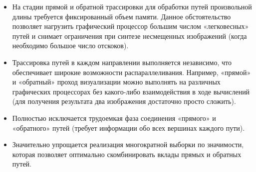 \begin{itemize}  
  \item На стадии прямой и обратной трассировки для обработки путей произвольной длины требуется фиксированный объем памяти. Данное обстоятельство позволяет нагрузить графический процессор большим числом «легковесных» путей и снимает ограничения при синтезе несмещенных изображений (когда необходимо большое число отскоков).
  
  \item Трассировка путей в каждом направлении выполняется независимо, что обеспечивает широкие возможности распараллеливания. Например, «прямой» и «обратный» проход визуализации можно выполнять на различных графических процессорах без какого-либо взаимодействия в ходе вычислений (для получения результата два изображения достаточно просто сложить).
  
  \item Полностью исключается трудоемкая фаза соединения «прямого» и «обратного» путей (требует информации обо всех вершинах каждого пути).
  
  \item Значительно упрощается реализация многократной выборки по значимости, которая позволяет оптимально скомбинировать вклады прямых и обратных путей.
\end{itemize}
